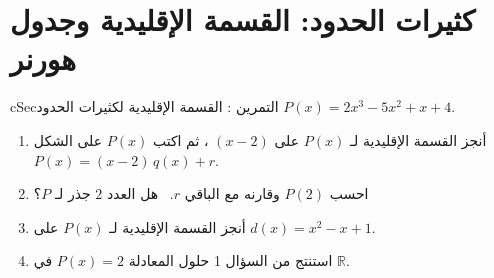 \documentclass[12pt,a4paper]{article}
\newenvironment{BOX}[2]{\begin{otherlanguage}{english}\begin{arbox}{#1}{#2}}{\end{arbox}\end{otherlanguage}}
\newcounter{exo}
\newenvironment{tamrin}[1]{\stepcounter{exo}\begin{BOX}{cSec}{التمرين \theexo: #1}}{\end{BOX}}
\newcommand{\R}{\mathbb{R}}
\begin{document}
\section{كثيرات الحدود: القسمة الإقليدية وجدول هورنر}
\begin{tamrin}{القسمة الإقليدية لكثيرات الحدود}
$P(x)=2x^3-5x^2+x+4$.
\begin{enumerate}
\item أنجز القسمة الإقليدية لـ $P(x)$ على $(x-2)$ ، ثم اكتب $P(x)$ على الشكل $P(x)=(x-2)\,q(x)+r$.
\item احسب $P(2)$ وقارنه مع الباقي $r$. \ هل العدد $2$ جذر لـ $P$؟
\item أنجز القسمة الإقليدية لـ $P(x)$ على $d(x)=x^2-x+1$.
\item استنتج من السؤال 1 حلول المعادلة $P(x)=2$ في $\R$.
\end{enumerate}
\end{tamrin}
\end{document}
